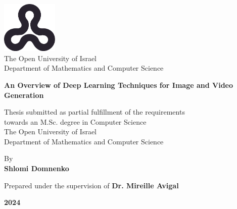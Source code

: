 \begin{titlepage}
    \begin{center}
        \vspace*{1cm}
        
        \includegraphics[width=0.2\textwidth]{images/ou_logo.png}\\
        The Open University of Israel\\
        Department of Mathematics and Computer Science
        
        \vspace{2cm}
        
        {\Large \textbf{An Overview of Deep Learning Techniques for Image and Video Generation}}
        \vspace{1.5cm}
        
        Thesis submitted as partial fulfillment of the requirements\\towards an M.Sc. degree in Computer Science\\
        The Open University of Israel\\
        Department of Mathematics and Computer Science
        
        \vspace{1cm}
        
        By \\
        \textbf{Shlomi Domnenko}
        
        \vspace{1cm}
        
        Prepared under the supervision of \textbf{Dr. Mireille Avigal}
        
        \vfill
        
        \textbf{{\monthname} 2024}
    \end{center}
\end{titlepage}